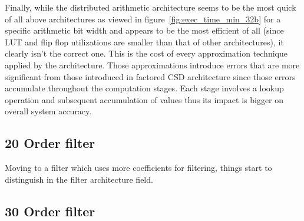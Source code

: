 Finally, while the distributed arithmetic architecture seems to be the most quick of all above architectures as viewed in figure~\ref{fig:exec_time_min_32b} for a specific arithmetic bit width and appears to be the most efficient of all (since LUT and flip flop utilizations are smaller than that of other architectures), it clearly isn't the correct one. This is the cost of every approximation technique applied by the architecture.
Those approximations introduce errors that are more significant from those introduced in factored CSD architecture since those errors accumulate throughout the computation stages. Each stage involves a lookup operation and subsequent accumulation of values thus its impact is bigger on overall system accuracy.

\subsection{20 Order filter}
Moving to a filter which uses more coefficients for filtering, things start to distinguish in the filter architecture field.


\subsection{30 Order filter}
